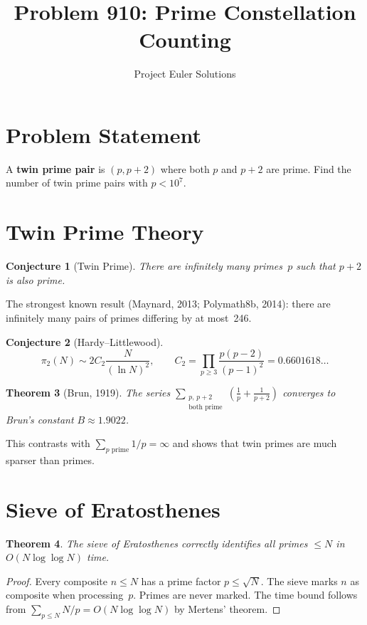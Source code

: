 \documentclass[11pt]{article}
\title{Problem 910: Prime Constellation Counting}
\author{Project Euler Solutions}
\date{}
\newtheorem{theorem}{Theorem}
\newtheorem{conjecture}[theorem]{Conjecture}
\begin{document}
\maketitle

\section{Problem Statement}

A \textbf{twin prime pair} is $(p, p+2)$ where both $p$ and $p+2$ are prime. Find the number of twin prime pairs with $p < 10^7$.

\section{Twin Prime Theory}

\begin{conjecture}[Twin Prime]
There are infinitely many primes~$p$ such that $p+2$ is also prime.
\end{conjecture}

The strongest known result (Maynard, 2013; Polymath8b, 2014): there are infinitely many pairs of primes differing by at most~246.

\begin{conjecture}[Hardy--Littlewood]
\[
\pi_2(N) \sim 2C_2 \frac{N}{(\ln N)^2}, \qquad C_2 = \prod_{p \ge 3} \frac{p(p-2)}{(p-1)^2} = 0.6601618\ldots
\]
\end{conjecture}

\begin{theorem}[Brun, 1919]
The series $\displaystyle\sum_{\substack{p,\,p+2\\\text{both prime}}} \!\left(\frac{1}{p} + \frac{1}{p+2}\right)$ converges to Brun's constant $B \approx 1.9022$.
\end{theorem}

This contrasts with $\sum_{p \text{ prime}} 1/p = \infty$ and shows that twin primes are much sparser than primes.

\section{Sieve of Eratosthenes}

\begin{theorem}
The sieve of Eratosthenes correctly identifies all primes $\le N$ in $O(N \log\log N)$ time.
\end{theorem}

\begin{proof}
Every composite $n \le N$ has a prime factor $p \le \sqrt{N}$. The sieve marks $n$ as composite when processing~$p$. Primes are never marked. The time bound follows from $\sum_{p \le N} N/p = O(N \log\log N)$ by Mertens' theorem.
\end{proof}
\end{document}
